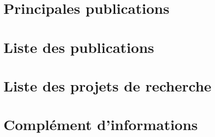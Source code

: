 \documentclass[a4paper, 11pt]{report}
\begin{document}
 
%
%
\chapter{{\color[RGB]{30,144,255} Principales publications}}



 
%
%
\chapter{{\color[RGB]{30,144,255} Liste des publications}}%
\label{se:liste_publi}






 
%
%
\chapter{{\color[RGB]{30,144,255} Liste des projets de recherche}}%



%
%
\chapter{{\color[RGB]{30,144,255} Complément d'informations}}%

\end{document}
